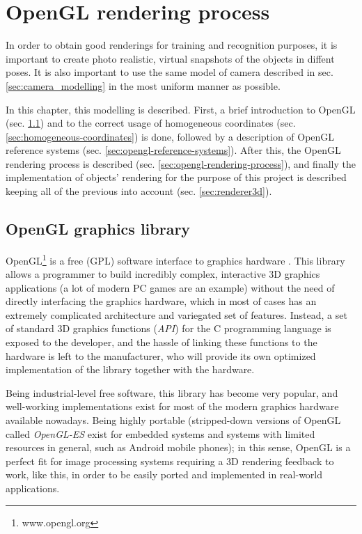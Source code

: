 \section{OpenGL rendering process} \label{sec:opengl-rendering}
In order to obtain good renderings for training and recognition purposes, it is
important to create photo realistic, virtual snapshots of the objects in
diffent poses. It is also important to use the same model of camera described in sec.
\ref{sec:camera_modelling} in the most uniform manner as possible.

In this chapter, this modelling is described. First, a brief
introduction to OpenGL (sec. \ref{sec:opengl-intro}) and to the correct usage of homogeneous coordinates (sec.
\ref{sec:homogeneous-coordinates}) is done, followed by a description of OpenGL reference systems (sec.
\ref{sec:opengl-reference-systems}). After this, the OpenGL rendering
process is described (sec. \ref{sec:opengl-rendering-process}), and finally the
implementation of objects' rendering for the purpose of this project is
described keeping all of the previous into account (sec. \ref{sec:renderer3d}).

\subsection{OpenGL graphics library} \label{sec:opengl-intro}
OpenGL\footnote{www.opengl.org} is a free (GPL) software interface to graphics hardware \cite{opengl-book}. This
library allows a programmer to build incredibly complex, interactive 3D graphics
applications (a lot of modern PC games are an example) without the need of
directly interfacing the graphics hardware, which in most of cases has an
extremely complicated architecture and variegated set of features. Instead, a
set of standard 3D graphics functions (\emph{API}) for the C programming
language is exposed to the developer, and the hassle of linking these
functions to the hardware is left to the manufacturer, who will provide its own
optimized implementation of the library together with the hardware.

Being industrial-level free software, this library has become very popular, and
well-working implementations exist for most of the modern graphics hardware
available nowadays. Being highly portable (stripped-down versions of OpenGL
called \emph{OpenGL-ES} exist for embedded systems and systems with limited
resources in general, such as Android mobile phones); in this sense, OpenGL is
a perfect fit for image processing systems requiring a 3D rendering feedback to
work, like this, in order to be easily ported and implemented in real-world
applications.

